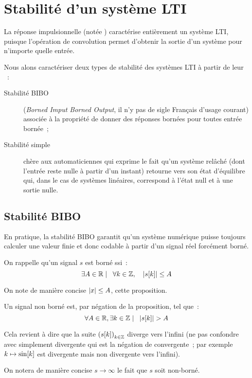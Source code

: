\section{Stabilité d'un système LTI}
\label{sec:stabilite}
La réponse impulsionnelle (notée \RIP) caractérise entièrement un
système LTI, puisque l'opération de convolution permet d'obtenir la
sortie d'un système pour n'importe quelle entrée.

Nous alons caractériser deux types de stabilité des systèmes LTI à
partir de leur \RIP{}~:
\begin{description}
\item[Stabilité BIBO] (\emph{Borned Imput Borned Output}, il n'y pas
  de sigle Français d'usage courant) associée à la propriété de donner
  des réponses bornées pour toutes entrée bornée~;
\item[Stabilité simple] chère aux automaticiennes qui exprime le fait
  qu'un système relâché (dont l'entrée reste nulle à partir d'un
  instant) retourne vers son état d'équilibre qui, dans le cas de
  systèmes linéaires, correspond à l'état null et à une sortie nulle.
\end{description}

\subsection{Stabilité BIBO}

En pratique, la stabilité BIBO garantit qu'un système numérique puisse
toujours calculer une valeur finie et donc codable à partir d'un
signal réel forcément borné.

\begin{remarque}
  On rappelle qu'un signal $s$ est borné ssi~:
  $$\exists A\in\mathbb{R} \mathrel{}\mid\mathrel{} \;\;{} \forall k\in \mathbb{Z}, \quad \left|s\!\left[k\right]\right|\leq A $$

  On note de manière concise $\left|x\right|\leq A$, cette proposition.

  Un signal non borné est, par négation de la proposition, tel que~:
  $$\forall A\in\mathbb{R}, \exists k\in \mathbb{Z} \mathrel{}\mid\mathrel{} \;\;  \left|s\!\left[k\right]\right| > A $$

  Cela revient à dire que la suite $\left(s\!\left[k\right]\right)_{k\in\mathbb{Z}}$ diverge
  vers l'infini (ne pas confondre avec simplement divergente qui est
  la négation de convergente~; par exemple $k\mapsto \sin\!\left[k\right]$ est
  divergente mais non divergente vers l'infini).

  On notera de manière concise $s\to\infty$ le fait que $s$ soit
  non-borné.
  
\end{remarque}

